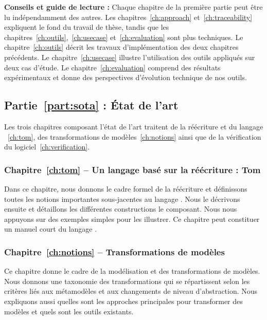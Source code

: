 \noindent \textbf{Conseils et guide de lecture :} Chaque chapitre de la
première
partie peut être lu indépendamment des autres. Les chapitres~\ref{ch:approach}
et~\ref{ch:traceability} expliquent le fond du travail de thèse, tandis que les
chapitres~\ref{ch:outils},~\ref{ch:usecase} et~\ref{ch:evaluation} sont plus
techniques. Le chapitre~\ref{ch:outils} décrit les travaux d'implémentation des
deux chapitres précédents. Le chapitre~\ref{ch:usecase} illustre l'utilisation
des outils appliqués sur deux cas d'étude. Le chapitre~\ref{ch:evaluation}
comprend des résultats expérimentaux et donne des perspectives d'évolution
technique de nos outils.


\subsection*{Partie~\ref{part:sota} : État de l'art}

Les trois chapitres composant l'état de l'art traitent de la réécriture et du
langage {\tom}~\ref{ch:tom}, des transformations de modèles~\ref{ch:notions}
ainsi que de la vérification du logiciel~\ref{ch:verification}.

\subsubsection{Chapitre~\ref{ch:tom} -- Un langage basé sur la réécriture : Tom}

Dans ce chapitre, nous donnons le cadre formel de la réécriture et définissons
toutes les notions importantes sous-jacentes au langage {\tom}. Nous le
décrivons ensuite et détaillons les différentes constructions le composant.
Nous nous appuyons sur des exemples simples pour les illustrer. Ce chapitre
peut constituer un manuel court du langage {\tom}.

\subsubsection{Chapitre~\ref{ch:notions}  -- Transformations de modèles}

Ce chapitre donne le cadre de la modélisation et des transformations de
modèles. Nous donnons une taxonomie des transformations qui se répartissent
selon les critères liés aux métamodèles et aux changements de niveau
d'abstraction. Nous expliquons aussi quelles sont les approches principales
pour transformer des modèles et quels sont les outils existants.

